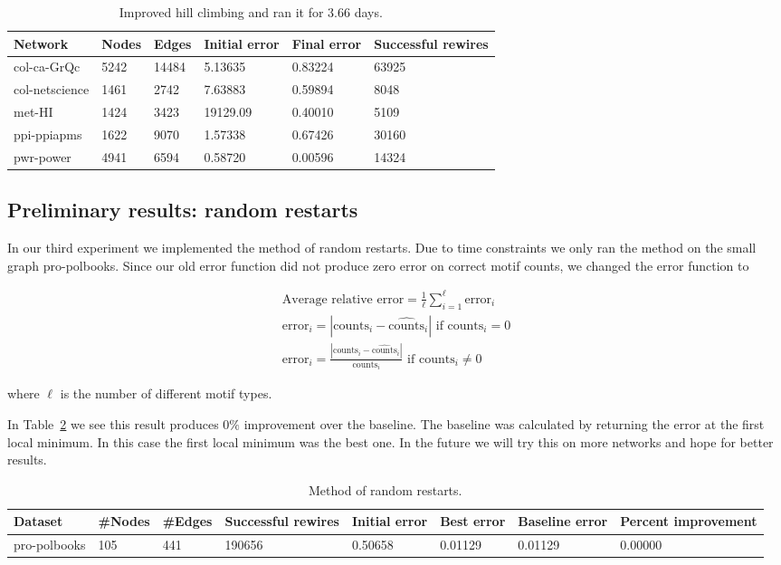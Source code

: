 \begin{table}[t]
\centering
\begin{tabular}{| l | l | l | | l | l | l |}
\hline
Network & Nodes & Edges & Initial error & Final error & Successful rewires\\ \hline
col-ca-GrQc & 5242 & 14484 & 5.13635& 0.83224& 63925 \\\hline
col-netscience & 1461 & 2742 & 7.63883& 0.59894& 8048 \\\hline
met-HI & 1424 & 3423 & 19129.09& 0.40010& 5109 \\\hline
ppi-ppiapms & 1622 & 9070 & 1.57338& 0.67426& 30160 \\\hline
pwr-power & 4941 & 6594 & 0.58720& 0.00596& 14324 \\\hline
\end{tabular}
\caption{Improved hill climbing and ran it for 3.66 days.}
\label{table:errors-exp2}
\end{table}

\subsection{Preliminary results: random restarts}
In our third experiment we implemented the method of random restarts.  Due
to time constraints we only ran the method on the small graph pro-polbooks.
Since our old error function did not produce zero error on correct motif
counts, we changed the error function to

\begin{eqnarray}
\label{eqn:newErrorFunction}
\mbox{Average relative error} = \frac{1}{\ell} \sum_{i = 1}^{\ell} \mbox{error}_i\nonumber\\
\mbox{error}_i = |\mbox{counts}_i - \widehat{\mbox{counts}}_i| \mbox{ if counts}_i = 0\\
\mbox{error}_i = \frac{|\mbox{counts}_i - \widehat{\mbox{counts}}_i|}{\mbox{counts}_i} \mbox{ if counts}_i \neq 0\nonumber
\end{eqnarray}

where $\ell$ is the number of different motif types.

In Table~\ref{tb:random-restarts} we see this result produces $0\%$
improvement over the baseline.  The baseline was calculated by returning
the error at the first local minimum.  In this case the first local minimum
was the best one.  In the future we will try this on more networks and hope
for better results.

\begin{table}[t]
\centering
\begin{tabular}{|l|l|l|l|l|l|l|l|}
\hline
Dataset & \#Nodes & \#Edges & Successful rewires& Initial error & Best error & Baseline error & Percent improvement \\ \hline
pro-polbooks & 105 & 441 & 190656 & 0.50658 & 0.01129& 0.01129& 0.00000 \\\hline
\end{tabular}
\caption{Method of random restarts.}
\label{tb:random-restarts}
\end{table}

